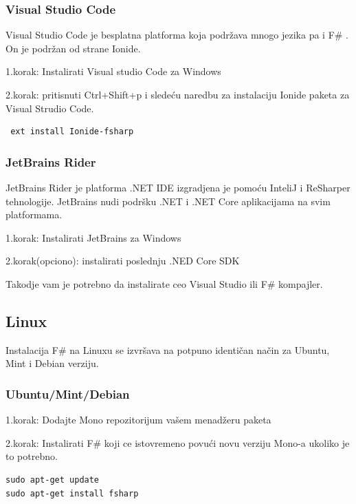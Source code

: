 \documentclass[a4paper]{article}
\begin{document}
\subsubsection{Visual Studio Code}
	
Visual Studio Code je besplatna platforma koja podržava mnogo jezika pa i F\# . On je podržan od strane Ionide\cite{ionide}.

1.korak: Instalirati Visual studio Code za Windows

2.korak: pritisnuti Ctrl+Shift+p i sledeću naredbu za instalaciju Ionide paketa za Visual Strudio Code.
\\
\begin{lstlisting}
 ext install Ionide-fsharp
\end{lstlisting}
 
\subsubsection{JetBrains Rider}

JetBrains Rider je platforma .NET IDE izgradjena je pomoću InteliJ i  ReSharper tehnologije. JetBrains nudi podršku .NET i .NET Core aplikacijama na svim platformama.

1.korak: Instalirati JetBrains za Windows

2.korak(opciono): instalirati poslednju .NED Core SDK

Takodje vam je potrebno da instalirate ceo Visual Studio ili F\# kompajler.


\subsection{Linux}

Instalacija F\# na Linuxu se izvršava na potpuno identičan način za Ubuntu, Mint i Debian verziju.

\subsubsection{Ubuntu/Mint/Debian}

1.korak: Dodajte Mono\cite{mono} repozitorijum vašem menadžeru paketa

2.korak: Instalirati F\# koji ce istovremeno povući novu verziju Mono-a ukoliko je to potrebno.
\\
\begin{lstlisting}
sudo apt-get update
sudo apt-get install fsharp
\end{lstlisting}
 
\end{document}
